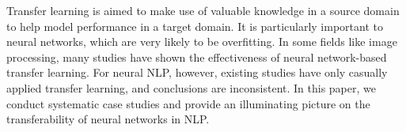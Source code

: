 Transfer learning is aimed to make use of valuable knowledge in a source domain to help model performance in a target domain. It is particularly important to neural networks, which are very likely to be overfitting. In some fields like image processing, many studies have shown the effectiveness of neural network-based transfer learning. For neural NLP, however, existing studies have only casually applied transfer learning, and conclusions are inconsistent. In this paper, we conduct systematic case studies and provide an illuminating picture on the transferability of neural networks in NLP.
